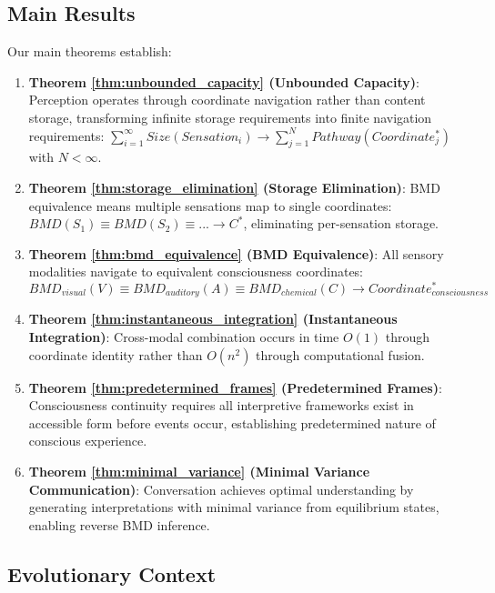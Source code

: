 \documentclass[12pt]{article}
\theoremstyle{definition}
\theoremstyle{remark}
\begin{document}
\subsection{Main Results}

Our main theorems establish:

\begin{enumerate}
\item \textbf{Theorem \ref{thm:unbounded_capacity} (Unbounded Capacity)}: Perception operates through coordinate navigation rather than content storage, transforming infinite storage requirements into finite navigation requirements: $\sum_{i=1}^{\infty} Size(Sensation_i) \rightarrow \sum_{j=1}^{N} Pathway(Coordinate_j^*)$ with $N < \infty$.

\item \textbf{Theorem \ref{thm:storage_elimination} (Storage Elimination)}: BMD equivalence means multiple sensations map to single coordinates: $BMD(S_1) \equiv BMD(S_2) \equiv ... \rightarrow C^*$, eliminating per-sensation storage.

\item \textbf{Theorem \ref{thm:bmd_equivalence} (BMD Equivalence)}: All sensory modalities navigate to equivalent consciousness coordinates:
\begin{equation}
BMD_{visual}(V) \equiv BMD_{auditory}(A) \equiv BMD_{chemical}(C) \rightarrow Coordinate^*_{consciousness}
\end{equation}

\item \textbf{Theorem \ref{thm:instantaneous_integration} (Instantaneous Integration)}: Cross-modal combination occurs in time $O(1)$ through coordinate identity rather than $O(n^2)$ through computational fusion.

\item \textbf{Theorem \ref{thm:predetermined_frames} (Predetermined Frames)}: Consciousness continuity requires all interpretive frameworks exist in accessible form before events occur, establishing predetermined nature of conscious experience.

\item \textbf{Theorem \ref{thm:minimal_variance} (Minimal Variance Communication)}: Conversation achieves optimal understanding by generating interpretations with minimal variance from equilibrium states, enabling reverse BMD inference.
\end{enumerate}

\subsection{Evolutionary Context}
\end{document}
